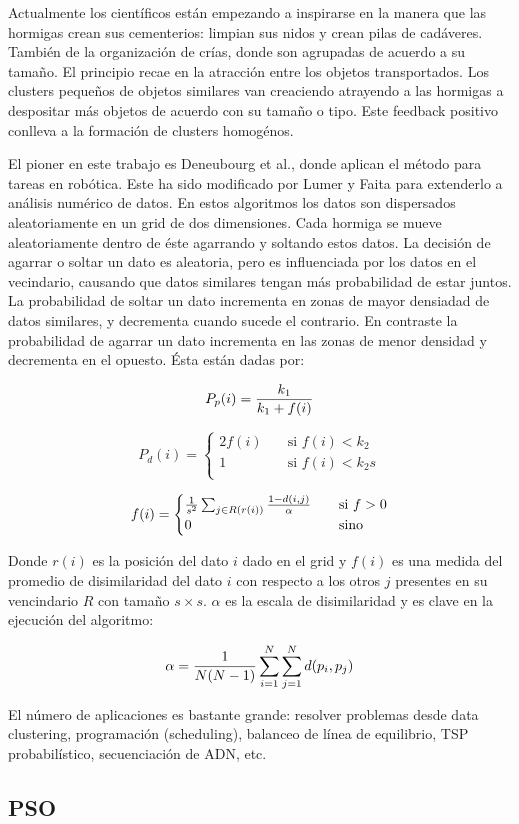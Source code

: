 Actualmente los cient\'ificos est\'an empezando a inspirarse en 
la manera que las hormigas crean sus cementerios: limpian sus nidos
y crean pilas de cad\'averes. 
Tambi\'en de la organizaci\'on de cr\'ias, donde son agrupadas
de acuerdo a su tama\~no. El principio recae en la atracci\'on
entre los objetos transportados. Los clusters pequeños de objetos
similares van creaciendo atrayendo a las hormigas a despositar m\'as
objetos de acuerdo con su tama\~no o tipo. Este feedback positivo
conlleva a la formaci\'on de clusters homog\'enos.

El pioner en este trabajo es Deneubourg et al., donde aplican el
m\'etodo para tareas en rob\'otica. Este ha sido modificado por Lumer
y Faita para extenderlo a an\'alisis num\'erico de datos.
En estos algoritmos los datos son dispersados aleatoriamente
en un grid de dos dimensiones. Cada hormiga se mueve aleatoriamente
dentro de \'este agarrando y soltando estos datos. La decisi\'on
de agarrar o soltar un dato es aleatoria,
pero es influenciada por los datos en el vecindario, 
causando que datos similares tengan m\'as probabilidad de
estar juntos. La probabilidad de soltar un dato incrementa
en zonas de mayor densiadad de datos similares, y decrementa
cuando sucede el contrario.  En contraste
la probabilidad de agarrar un dato incrementa en las zonas de
menor densidad y decrementa en el opuesto.
\'Esta est\'an dadas por:

\[
P_p(i) = {k_1 \over {k_1 + f(i)}}
\]

\[
P_d(i) = 
  \begin{cases}
    2f(i) & \quad \text{si $f(i)<k_2$}\\
    1     & \quad \text{si $f(i) < k_2s$}\\
  \end{cases}
\]

\[
f(i) =
  \begin{cases}
    {{1} \over {s^2}} \sum_{j \in R(r(i))} {{1 - {d(i,j)}} \over \alpha} & \quad \text{si $f > 0$}\\
    0     & \quad \text{sino}
  \end{cases} 
\]

Donde $r(i)$ es la posici\'on del dato $i$ dado en el grid y $f(i)$ es una medida
del promedio de disimilaridad del dato $i$ con respecto a los otros $j$
presentes en su vencindario $R$ con tama\~no $s \times s$. $\alpha$
es la escala de disimilaridad y es clave en la ejecuci\'on del algoritmo:

\[
\alpha = {{1 \over {N(N-1)}} \sum_{i=1}^N \sum_{j=1}^N d(p_i,p_j)}
\]

\cite{OuBa2007}

El n\'umero de aplicaciones es bastante grande: resolver problemas
desde data clustering, programaci\'on (scheduling), balanceo
de l\'inea de equilibrio, TSP probabil\'istico, secuenciaci\'on de 
ADN, etc. \cite{GePo2010}


\subsection{PSO}
